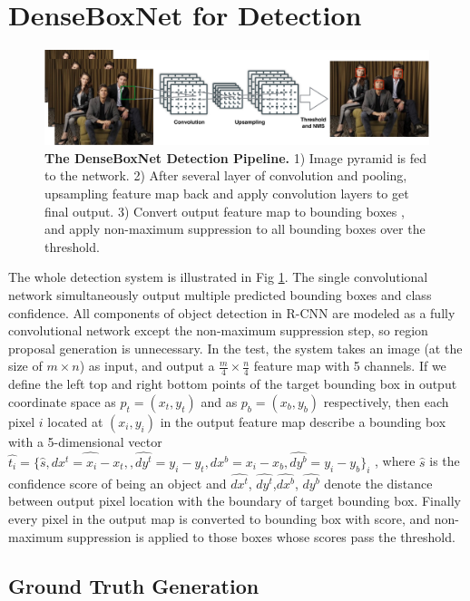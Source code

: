  
\section{DenseBoxNet for Detection }
\label{sec:model} 
	\begin{figure}[!hbtp]
	\centering
	 \includegraphics[scale=0.39]{figures/figure1-crop.pdf}
	\caption{\textbf{The DenseBoxNet Detection Pipeline.} 1) Image pyramid is fed to the network. 2) After several layer of convolution and pooling, upsampling feature map back and apply convolution layers to get final output. 3) Convert output feature map to bounding boxes , and apply non-maximum suppression to all bounding boxes over the threshold. }
	\label{fig:fig_overview}
	\end{figure}


The whole detection system is illustrated in Fig \ref{fig:fig_overview}. The single convolutional network simultaneously output multiple predicted bounding boxes and class confidence. All components of object detection in R-CNN are modeled as a fully convolutional network except the non-maximum suppression step, so region proposal generation is unnecessary. In the test, the system takes an image (at the size of $m\times n$) as input, and output a $ \frac{m}{4} \times \frac{n}{4} $ feature map with 5 channels.
If we define the left top and right bottom points of the target bounding box in output coordinate space as $ p_t = (x_t, y_t)$ and as $ p_b = (x_b, y_b)$ respectively, then each pixel $i$ located at $(x_i, y_i)$ in the output feature map describe a bounding box with a 5-dimensional vector $\hat{t_i } = \{ \hat{s }, \hat{dx^{t}= x_i - x_t,},\hat{dy^{t}} = y_i - y_t,\hat{dx^{b}}= x_i - x_b,\hat{dy^{b}}= y_i - y_b \}_i$ , where $\hat{s }$ is the confidence score of being an object and $\hat{dx^{t}}$, $\hat{dy^{t}}$,$\hat{dx^{b}}$, $\hat{dy^{b}}$ denote the distance between output pixel location with the boundary of target bounding box. Finally every pixel in the output map is converted to bounding box with score, and non-maximum suppression is applied to those boxes whose scores pass the threshold. 

\subsection{Ground Truth Generation } 

